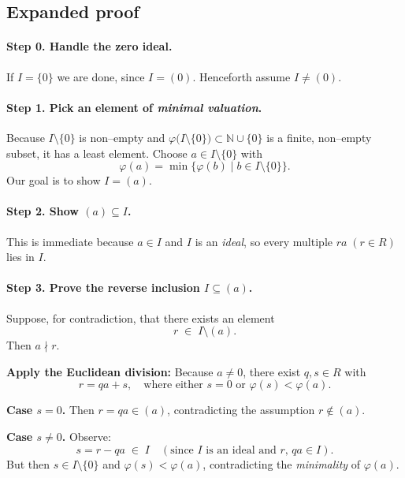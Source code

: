 \documentclass[12pt]{article}
\theoremstyle{definition} %
\theoremstyle{plain} %
\begin{document}
\subsection*{Expanded proof}

\paragraph{Step 0.  Handle the zero ideal.}
If \(I=\{0\}\) we are done, since \(I=(0)\).  
Henceforth assume \(I\neq(0)\).

\medskip
\paragraph{Step 1.  Pick an element of \emph{minimal valuation}.}
Because \(I\setminus\{0\}\) is non–empty and
\(\varphi\bigl(I\setminus\{0\}\bigr)\subset\mathbb N\cup\{0\}\)
is a finite, non–empty subset, it has a least element.
Choose \(a\in I\setminus\{0\}\) with
\[
      \boxed{\;
        \varphi(a)=\min\!\bigl\{\varphi(b)\mid b\in I\setminus\{0\}\bigr\}.
      \;}
\]
Our goal is to show \(I=(a)\).

\medskip
\paragraph{Step 2.  Show \((a)\subseteq I\).}
This is immediate because \(a\in I\) and \(I\) is an \emph{ideal},
so every multiple \(ra\;(r\in R)\) lies in \(I\).

\medskip
\paragraph{Step 3.  Prove the reverse inclusion \(I\subseteq(a)\).}
Suppose, for contradiction, that there exists an element
\[
      r\;\in\; I\setminus(a).
\]
Then \(a\nmid r\).

\smallskip
\textbf{Apply the Euclidean division:}  
Because \(a\neq0\), there exist \(q,s\in R\) with
\[
   r = qa + s,
   \quad
   \text{where either } s=0 \text{ or } \varphi(s)<\varphi(a).
\]

\smallskip
\textbf{Case \(s=0\).}\;
Then \(r=qa\in(a)\), contradicting the assumption \(r\notin(a)\).

\smallskip
\textbf{Case \(s\neq0\).}\;
Observe:
\[
  s = r - qa\;\in\;I
  \quad (\text{since }I\text{ is an ideal and }r,\,qa\in I).
\]
But then \(s\in I\setminus\{0\}\) and
\(\varphi(s)<\varphi(a)\), contradicting the \emph{minimality} of
\(\varphi(a)\).
\end{document}

